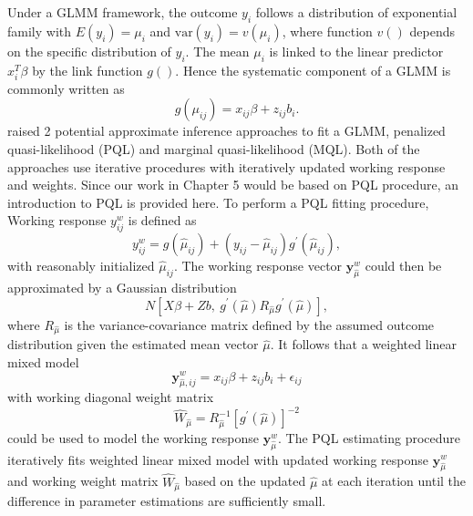 Under a GLMM framework, the outcome $y_i$ follows a distribution of exponential family with $E(y_i)=\mu_i$ and $\text{var}(y_i)=v(\mu_i)$, where function $v()$ depends on the specific distribution of $y_{i}$. The mean $\mu_i$ is linked to the linear predictor $x_i^T\beta$ by the link function $g()$. Hence the systematic component of a GLMM is commonly written as 
\begin{equation}\label{mod:GLMMglmm}
g(\mu_{ij})=x_{ij}\beta + z_{ij}b_i.
\end{equation}
\citet{breslow1993approximate} raised 2 potential approximate inference approaches to fit a GLMM, penalized quasi-likelihood (PQL) and marginal quasi-likelihood (MQL). Both of the approaches use iterative procedures with iteratively updated working response and weights. Since our work in Chapter 5 would be based on PQL procedure, an introduction to PQL is provided here. To perform a PQL fitting procedure, Working response $y_{ij}^w$ is defined as
\begin{equation} \label{eq:workingresponse}
y_{ij}^w=g(\hat{\mu}_{ij})+(y_{ij}-\hat{\mu}_{ij})g^\prime(\hat{\mu}_{ij}),
\end{equation}
with reasonably initialized $\hat{\mu}_{ij}$. The working response vector $\mathbf{y}_{\hat{\mu}}^w$ could then be approximated by a Gaussian distribution 
\begin{equation} \label{eq:ApproxGauss}
N[X\beta+Zb,\ g^\prime(\hat{\mu})R_{\hat{\mu}}  g^\prime(\hat{\mu})],
\end{equation} 
where $R_{\hat{\mu}}$ is the variance-covariance matrix defined by the assumed outcome distribution given the estimated mean vector $\hat{\mu}$. It follows that a weighted linear mixed model 
\begin{equation} \label{mod:workingLME}
\mathbf{y}_{\hat{\mu},ij}^w=x_{ij}\beta+z_{ij}b_i+\epsilon_{ij}
\end{equation}
with working diagonal weight matrix 
\begin{equation} \label{eq:W}
\hat{W}_{\hat{\mu}}=R_{\hat{\mu}}^{-1}[g^\prime(\hat{\mu})]^{-2}
\end{equation} 
could be used to model the working response $\mathbf{y}_{\hat{\mu}}^w$. The PQL estimating procedure iteratively fits weighted linear mixed model with updated working response $\mathbf{y}_{\hat{\mu}}^w$ and working weight matrix $\hat{W}_{\hat{\mu}}$ based on the updated $\hat{\mu}$ at each iteration until the difference in parameter estimations are sufficiently small. 


